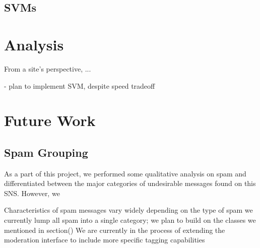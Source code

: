 \documentclass[preprint]{acm_proc_article-sp}
\begin{document}
\subsection{SVMs}

%
%

\section{Analysis}
From a site's perspective, ...

- plan to implement SVM, despite speed tradeoff 

\section{Future Work}

\subsection{Spam Grouping}

As a part of this project, we performed some qualitative analysis on spam and differentiated between the major categories of undesirable messages found on this SNS. However, we 

Characteristics of spam messages vary widely depending on the type of spam
we currently lump all spam into a single category; we plan to build on the classes we mentioned in section()
We are currently in the process of extending the moderation interface to include more specific tagging capabilities
\end{document}
